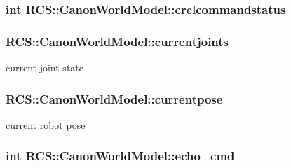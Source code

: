 \hypertarget{structRCS_1_1CanonWorldModel_aa68c655c78e0897dc5fda1bf90fc60aa}{
\subsubsection[{crclcommandstatus}]{\setlength{\rightskip}{0pt plus 5cm}int R\-C\-S\-::\-Canon\-World\-Model\-::crclcommandstatus}}\label{structRCS_1_1CanonWorldModel_aa68c655c78e0897dc5fda1bf90fc60aa}
\hypertarget{structRCS_1_1CanonWorldModel_a0060a81cde9ecf9ae02c5e61b8345a5b}{
\subsubsection[{currentjoints}]{ R\-C\-S\-::\-Canon\-World\-Model\-::currentjoints}}\label{structRCS_1_1CanonWorldModel_a0060a81cde9ecf9ae02c5e61b8345a5b}
current joint state \hypertarget{structRCS_1_1CanonWorldModel_a7220d95245ac8a787e35efb2cc399cb5}{
\subsubsection[{currentpose}]{ R\-C\-S\-::\-Canon\-World\-Model\-::currentpose}}\label{structRCS_1_1CanonWorldModel_a7220d95245ac8a787e35efb2cc399cb5}
current robot pose \hypertarget{structRCS_1_1CanonWorldModel_a120915aac1c50a1e4f4856dccff23fdc}{
\subsubsection[{echo\-\_\-cmd}]{\setlength{\rightskip}{0pt plus 5cm}int R\-C\-S\-::\-Canon\-World\-Model\-::echo\-\_\-cmd}}\label{structRCS_1_1CanonWorldModel_a120915aac1c50a1e4f4856dccff23fdc}
